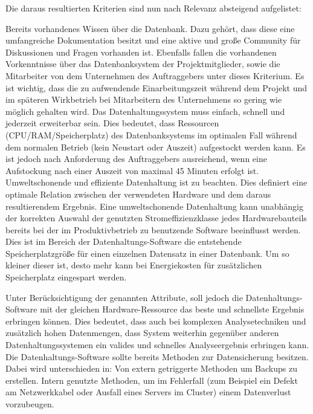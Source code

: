 Die daraus resultierten Kriterien sind nun nach Relevanz absteigend
aufgelistet:
\begin{outline}
  \1 Bereits vorhandenes Wissen über die Datenbank. Dazu gehört, dass diese
  eine umfangreiche Dokumentation besitzt und eine aktive und große Community
  für Diskussionen und Fragen vorhanden ist. Ebenfalls fallen die vorhandenen
  Vorkenntnisse über das Datenbanksystem der Projektmitglieder, sowie die
  Mitarbeiter von dem Unternehmen des Auftraggebers unter dieses Kriterium. Es
  ist wichtig, dass die zu aufwendende Einarbeitungszeit während dem Projekt
  und im späteren Wirkbetrieb bei Mitarbeitern des Unternehmens so gering wie
  möglich gehalten wird.
  \1 Das Datenhaltungssystem muss einfach, schnell und jederzeit erweiterbar
  sein. Dies bedeutet, dass Ressourcen (CPU/RAM/Speicherplatz) des
  Datenbanksystems im optimalen Fall während dem normalen Betrieb (kein
  Neustart oder Auszeit) aufgestockt werden kann. Es ist jedoch nach
  Anforderung des Auftraggebers ausreichend, wenn eine Aufstockung nach einer
  Auszeit von maximal 45 Minuten erfolgt ist.
  \1 Umweltschonende und effiziente Datenhaltung ist zu beachten. Dies
  definiert eine optimale Relation zwischen der verwendeten Hardware und dem
  daraus resultierendem Ergebnis. Eine umweltschonende Datenhaltung kann
  unabhängig der korrekten Auswahl der genutzten Stromeffizienzklasse jedes
  Hardwarebauteils bereits bei der im Produktivbetrieb zu benutzende Software
  beeinflusst werden. Dies ist im Bereich der Datenhaltungs-Software die
  entstehende Speicherplatzgröße für einen einzelnen Datensatz in einer
  Datenbank. Um so kleiner dieser ist, desto mehr kann bei Energiekosten für
  zusätzlichen Speicherplatz eingespart werden.

  Unter Berücksichtigung der genannten Attribute, soll jedoch die
  Datenhaltungs-Software mit der gleichen Hardware-Ressource das beste und
  schnellste Ergebnis erbringen können. Dies bedeutet, dass auch bei komplexen
  Analysetechniken und zusätzlich hohen Datenmengen, dass System weiterhin
  gegenüber anderen Datenhaltungssystemen ein valides und schnelles
  Analyseergebnis erbringen kann.
  \1 Die Datenhaltungs-Software sollte bereits Methoden zur Datensicherung
  besitzen. Dabei wird unterschieden in:
    \2 Von extern getriggerte Methoden um Backups zu erstellen.
    \2 Intern genutzte Methoden, um im Fehlerfall (zum Beispiel ein Defekt am
    Netzwerkkabel oder Ausfall eines Servers im Cluster) einem Datenverlust
    vorzubeugen.
\end{outline}
\nl%


